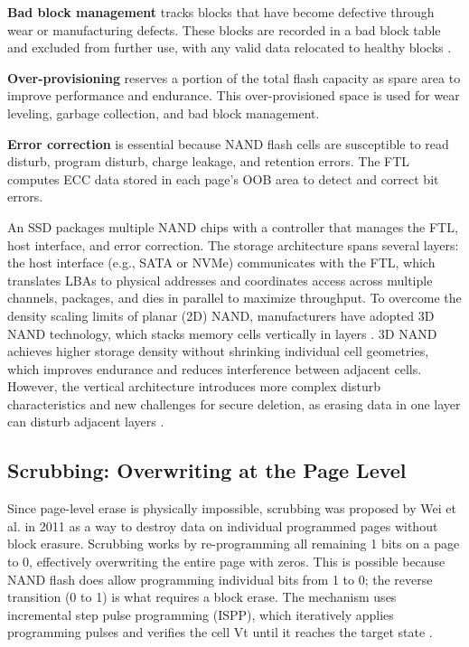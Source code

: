 \textbf{Bad block management} tracks blocks that have become defective through wear or manufacturing defects. 
These blocks are recorded in a bad block table and excluded from further use, with any valid data relocated 
to healthy blocks \cite{duplicateschen2022,homaidi2009data}.

\textbf{Over-provisioning} reserves a portion of the total flash capacity as spare area to improve performance 
and endurance. This over-provisioned space is used for wear leveling, garbage collection, and bad block management. 
\cite{aronsson2025secure,ahn2021forensics}

\textbf{Error correction} is essential because NAND flash cells are susceptible to read disturb, program disturb, 
charge leakage, and retention errors. The FTL computes ECC data stored in each page's OOB area to detect and 
correct bit errors\cite{zhang2018ensuring}.

An SSD packages multiple NAND chips with a controller that manages the FTL, host interface, and error correction. 
The storage architecture spans several layers: the host interface (e.g., SATA or NVMe) communicates with the FTL, 
which translates LBAs to physical addresses and coordinates access across multiple channels, packages, and dies 
in parallel to maximize throughput. To overcome the density scaling limits of planar (2D) NAND, manufacturers 
have adopted 3D NAND technology, which stacks memory cells vertically in layers \cite{aronsson2025secure}. 
3D NAND achieves higher storage density without shrinking individual cell geometries, which improves endurance 
and reduces interference between adjacent cells. However, the vertical architecture introduces more complex 
disturb characteristics and new challenges for secure deletion, as erasing data in one layer can disturb 
adjacent layers \cite{ahn2021forensics}.

\subsection{Scrubbing: Overwriting at the Page Level}
Since page-level erase is physically impossible, scrubbing was proposed by Wei et al. in 2011 as a 
way to destroy data on individual programmed pages without block erasure. Scrubbing works by 
re-programming all remaining 1 bits on a page to 0, effectively overwriting the entire page with 
zeros. This is possible because NAND flash does allow programming individual bits from 1 to 0; the 
reverse transition (0 to 1) is what requires a block erase. The mechanism uses incremental step 
pulse programming (ISPP), which iteratively applies programming pulses and verifies the cell Vt 
until it reaches the target state \cite{aronsson2025secure,3dnandwang2018}.

